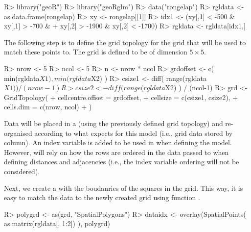 \documentclass[article]{jss}
\begin{document}
\begin{Schunk}
\begin{Sinput}
R> library("geoR")
R> library("geoRglm")
R> data("rongelap")
R> rgldata <- as.data.frame(rongelap)
R> xy <- rongelap[[1]]
R> idx1 <- (xy[,1] < -500 & xy[,1] > -700 & 
+     xy[,2] > -1900 & xy[,2] < -1700)
R> rgldata <- rgldata[idx1,]
\end{Sinput}
\end{Schunk}


The following step is to  define the grid topology for the grid that will be
used to match these points to. The grid is defined to be of dimension 
$5\times 5$. 

\begin{Schunk}
\begin{Sinput}
R> nrow <- 5
R> ncol <- 5
R> n <- nrow * ncol
R> grdoffset <- c( min(rgldata$X1), min(rgldata$X2) )
R> csize1 <- diff( range(rgldata$X1) ) / (nrow-1)
R> csize2 <- diff( range(rgldata$X2) ) / (ncol-1)
R> grd <- GridTopology(
+     cellcentre.offset = grdoffset, 
+     cellsize = c(csize1, csize2),
+     cells.dim = c(nrow, ncol)
+  )
\end{Sinput}
\end{Schunk}
\noindent
Data will be placed in a  (using the previously
defined grid topology) and re-organised according to what  expects
for this model (i.e., grid data stored by column).  An index variable 
is added to be used in  when defining the model. However, 
 will rely on how the rows are ordered in the data passed to 
 when defining distances and adjacencies (i.e., the index
variable ordering will not be considered).

\begin{Schunk}
\end{Schunk}


Next, we create a  with the boudanries of the squares
in the grid. This way, it is easy to match the data to the newly created grid using function
.


\begin{Schunk}
\begin{Sinput}
R> polygrd <- as(grd, "SpatialPolygons")
R> dataidx <- overlay(SpatialPoints( as.matrix(rgldata[, 1:2]) ), polygrd)
\end{Sinput}
\end{Schunk}
\end{document}
